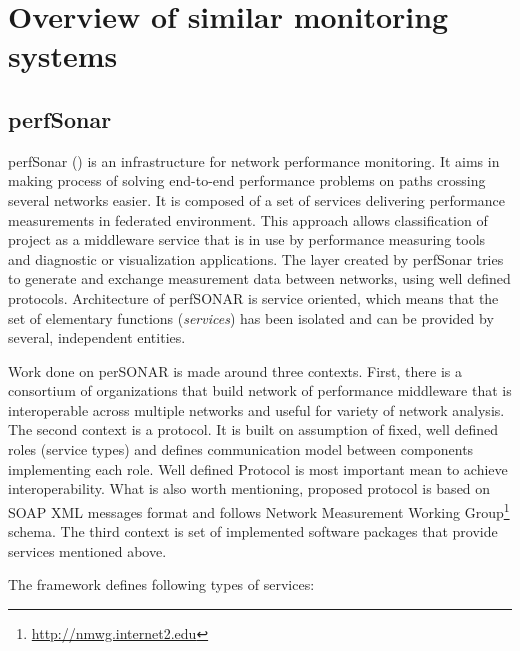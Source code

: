 %
\section{Overview of similar monitoring systems}
\label{sec:ch2_similar}

\subsection{perfSonar}

perfSonar (\cite{perfSonar1,perfSonar2,perfSonar3}) is an infrastructure for network performance monitoring. It aims in making process of solving end-to-end performance problems on paths crossing several networks easier. It is composed of a set of services delivering performance measurements in federated environment. This approach allows classification of  project as a middleware service that is in use by performance measuring tools and diagnostic or visualization applications. The layer created by perfSonar tries to generate and exchange measurement data between networks, using well defined protocols. Architecture of perfSONAR is service oriented, which means that the set of elementary functions (\emph{services}) has been isolated and can be provided by several, independent entities. 

Work done on perSONAR is made around three contexts. First, there is a consortium of organizations that build network of performance middleware that is interoperable across multiple networks and useful for variety of network analysis. The second context is a protocol. It is built on assumption of fixed, well defined roles (service types) and defines communication model between components implementing each role. Well defined Protocol is most important mean to achieve interoperability. What is also worth mentioning, proposed protocol is based on SOAP XML messages format and follows Network Measurement Working Group\footnote{\url{http://nmwg.internet2.edu}} schema. The third context is set of implemented software packages that provide services mentioned above.

The framework defines following types of services:

